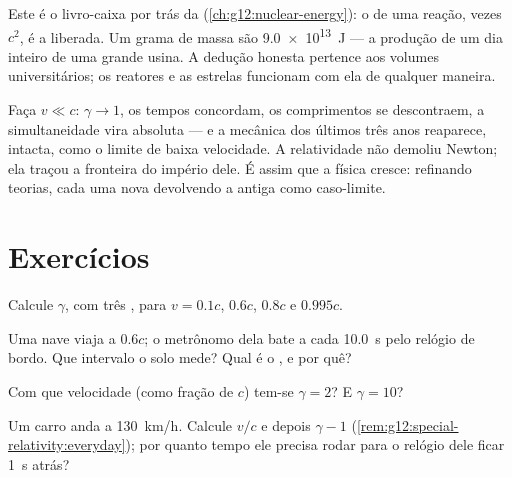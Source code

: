 \begin{remark}\label{rem:g12:special-relativity:emc2seen}
Este é o livro-caixa por trás da  (\cref{ch:g12:nuclear-energy}): o
 de uma reação, vezes $c^2$, é a  liberada. Um grama de massa são
\qty{9.0e13}{J} --- a produção de um dia inteiro de uma grande usina. A dedução honesta
pertence aos volumes universitários; os reatores e as estrelas funcionam com ela de
qualquer maneira.
\end{remark}

\begin{remark}\label{rem:g12:special-relativity:newton}
Faça $v \ll c$: $\gamma \to 1$, os tempos concordam, os comprimentos se descontraem, a
simultaneidade vira absoluta --- e a mecânica dos últimos três anos reaparece, intacta,
como o limite de baixa velocidade. A relatividade não demoliu Newton; ela traçou a
fronteira do império dele. É assim que a física cresce: refinando teorias, cada uma nova
devolvendo a antiga como caso-limite.
\end{remark}

\section{Exercícios}

\begin{exercise}[$\star$]\label{exo:g12:special-relativity:1}
Calcule $\gamma$, com três , para $v = 0.1c$, $0.6c$, $0.8c$ e
$0.995c$.
\end{exercise}

\begin{exercise}[$\star$]\label{exo:g12:special-relativity:2}
Uma nave viaja a $0.6c$; o metrônomo dela bate a cada \qty{10.0}{s} pelo relógio de
bordo. Que intervalo o solo mede? Qual é o , e por quê?
\end{exercise}

\begin{exercise}[$\star$]\label{exo:g12:special-relativity:3}
Com que velocidade (como fração de $c$) tem-se $\gamma = 2$? E $\gamma = 10$?
\end{exercise}

\begin{exercise}[$\star$]\label{exo:g12:special-relativity:4}
Um carro anda a \qty{130}{km/h}. Calcule $v/c$ e depois $\gamma - 1$
(\cref{rem:g12:special-relativity:everyday}); por quanto tempo ele precisa rodar para o
relógio dele ficar \qty{1}{s} atrás?
\end{exercise}

